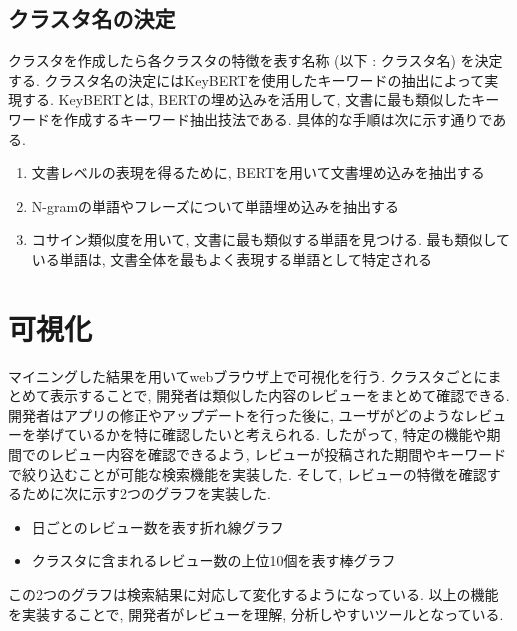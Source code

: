 \subsection{クラスタ名の決定}
クラスタを作成したら各クラスタの特徴を表す名称 (以下 : クラスタ名) を決定する. 
クラスタ名の決定にはKeyBERT\cite{keybert}を使用したキーワードの抽出によって実現する. KeyBERTとは, BERTの埋め込みを活用して, 文書に最も類似したキーワードを作成するキーワード抽出技法である. 
具体的な手順は次に示す通りである. 

\begin{enumerate}
  \item 文書レベルの表現を得るために, BERTを用いて文書埋め込みを抽出する
  \item N-gramの単語やフレーズについて単語埋め込みを抽出する
  \item コサイン類似度を用いて, 文書に最も類似する単語を見つける. 最も類似している単語は, 文書全体を最もよく表現する単語として特定される
\end{enumerate}


\section{可視化}
マイニングした結果を用いてwebブラウザ上で可視化を行う. クラスタごとにまとめて表示することで, 開発者は類似した内容のレビューをまとめて確認できる. 
開発者はアプリの修正やアップデートを行った後に, ユーザがどのようなレビューを挙げているかを特に確認したいと考えられる. したがって, 特定の機能や期間でのレビュー内容を確認できるよう, レビューが投稿された期間やキーワードで絞り込むことが可能な検索機能を実装した. 
そして, レビューの特徴を確認するために次に示す2つのグラフを実装した.
\begin{itemize}
  \item 日ごとのレビュー数を表す折れ線グラフ
  \item クラスタに含まれるレビュー数の上位10個を表す棒グラフ
\end{itemize}
この2つのグラフは検索結果に対応して変化するようになっている. 以上の機能を実装することで, 開発者がレビューを理解, 分析しやすいツールとなっている. 